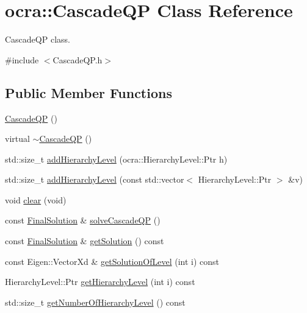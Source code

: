 \hypertarget{classocra_1_1CascadeQP}{}\section{ocra\+:\+:Cascade\+QP Class Reference}
\label{classocra_1_1CascadeQP}


Cascade\+QP class.  




{\ttfamily \#include $<$Cascade\+Q\+P.\+h$>$}

\subsection*{Public Member Functions}
\begin{DoxyCompactItemize}
\item 
\hyperlink{classocra_1_1CascadeQP_a545a3098762becf8a663eb8ab3bd4899}{Cascade\+QP} ()
\item 
virtual \hyperlink{classocra_1_1CascadeQP_a843673d4951f7a8e972598d0f361ad8d}{$\sim$\+Cascade\+QP} ()
\item 
std\+::size\+\_\+t \hyperlink{classocra_1_1CascadeQP_ab1ac4edfcf8e8c7567fc0a5ca5bd5f86}{add\+Hierarchy\+Level} (ocra\+::\+Hierarchy\+Level\+::\+Ptr h)
\item 
std\+::size\+\_\+t \hyperlink{classocra_1_1CascadeQP_a6415299f7159a36a75940e073f64b770}{add\+Hierarchy\+Level} (const std\+::vector$<$ Hierarchy\+Level\+::\+Ptr $>$ \&v)
\item 
void \hyperlink{classocra_1_1CascadeQP_a476d6af7b355fd8a3887e9708253cd1a}{clear} (void)
\item 
const \hyperlink{structocra_1_1FinalSolution}{Final\+Solution} \& \hyperlink{classocra_1_1CascadeQP_a11e01b608414badd9af6794076eb8b33}{solve\+Cascade\+QP} ()
\item 
const \hyperlink{structocra_1_1FinalSolution}{Final\+Solution} \& \hyperlink{classocra_1_1CascadeQP_af59591ea0fdc81da5866fa3b99fd9d67}{get\+Solution} () const
\item 
const Eigen\+::\+Vector\+Xd \& \hyperlink{classocra_1_1CascadeQP_ab897ead27cb45e35281f39d389e8ed87}{get\+Solution\+Of\+Level} (int i) const
\item 
Hierarchy\+Level\+::\+Ptr \hyperlink{classocra_1_1CascadeQP_a49b3ce4ed68507905755b63f878c1990}{get\+Hierarchy\+Level} (int i) const
\item 
std\+::size\+\_\+t \hyperlink{classocra_1_1CascadeQP_a1f714b8b6024d46a4e9545324a21e702}{get\+Number\+Of\+Hierarchy\+Level} () const
\end{DoxyCompactItemize}
